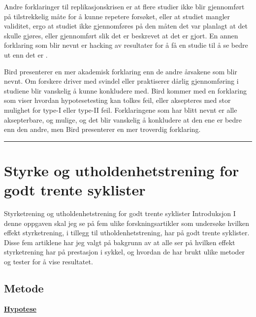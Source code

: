 \documentclass[
]{book}
\begin{document}
Andre forklaringer til replikasjonskrisen er at flere studier ikke blir gjennomført på tilstrekkelig måte for å kunne repetere forsøket, eller at studiet mangler validitet, ergo at studiet ikke gjennomføres på den måten det var planlagt at det skulle gjøres, eller gjennomført slik det er beskrevet at det er gjort. En annen forklaring som blir nevnt er hacking av resultater for å få en studie til å se bedre ut enn det er \citep{bird2020}.

Bird presenterer en mer akademisk forklaring enn de andre årsakene som blir nevnt. Om forskere driver med svindel eller praktiserer dårlig gjennomføring i studiene blir vanskelig å kunne konkludere med. Bird kommer med en forklaring som viser hvordan hypotesetesting kan tolkes feil, eller aksepteres med stor mulighet for type-I eller type-II feil. Forklaringene som har blitt nevnt er alle aksepterbare, og mulige, og det blir vanskelig å konkludere at den ene er bedre enn den andre, men Bird presenterer en mer troverdig forklaring.

\citep{bird2020}

\begin{center}\rule{0.5\linewidth}{0.5pt}\end{center}

\hypertarget{styrke-og-utholdenhetstrening-for-godt-trente-syklister}{%
\chapter{Styrke og utholdenhetstrening for godt trente syklister}\label{styrke-og-utholdenhetstrening-for-godt-trente-syklister}}

Styrketrening og utholdenhetstrening for godt trente syklister Introduksjon I denne oppgaven skal jeg se på fem ulike forskningsartikler som undersøke hvilken effekt styrketrening, i tillegg til utholdenhetstrening, har på godt trente syklister. Disse fem artiklene har jeg valgt på bakgrunn av at alle ser på hvilken effekt styrketrening har på prestasjon i sykkel, og hvordan de har brukt ulike metoder og tester for å vise resultatet.

\hypertarget{metode-1}{%
\section{Metode}\label{metode-1}}

\underline{\textbf{Hypotese}}
\end{document}
